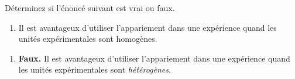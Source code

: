 \begin{exercice}
Déterminez si l'énoncé suivant est vrai ou faux.
\begin{enumerate}[label=(\alph*)]
  \item Il est avantageux d'utiliser l'appariement dans une expérience quand les unités
  expérimentales sont homogènes.
\end{enumerate}
\begin{solution}
\begin{enumerate}[label=(\alph*)]
  \item \textbf{Faux.} Il est avantageux d'utiliser l'appariement dans une expérience quand
  les unités expérimentales sont \emph{hétérogènes}.
\end{enumerate}
\end{solution}
\end{exercice}


